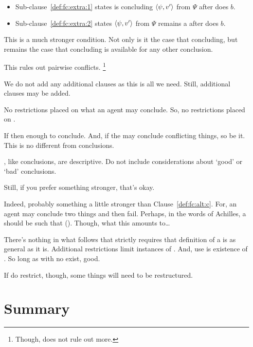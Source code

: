 \begin{note}
  \begin{itemize}[noitemsep]
  \item
    Sub-clause~\ref{def:fc:extra:1} states \vAgent{} is concluding \(\langle \psi, v' \rangle\) from \(\Psi\) after \vAgent{} does \(b\).
  \item
    Sub-clause~\ref{def:fc:extra:2} states \vAgent{} \(\langle \psi, v' \rangle\) from \(\Psi\) remains a \fc{} after \vAgent{} does \(b\).
  \end{itemize}

  \noindent This is a much stronger condition.
  Not only is it the case that concluding, but remains the case that concluding is available for any other conclusion.

  This rules out pairwise conflicts.%
  \footnote{
    Though, does not rule out more.
  }

  We do not add any additional clauses as this is all we need.
  Still, additional clauses may be added.

  No restrictions placed on what an agent may conclude.
  So, no restrictions placed on .

  If \fc{} then enough to conclude.
  And, if the may conclude conflicting things, so be it.
  This is no different from conclusions.

  , like conclusions, are descriptive.
  Do not include considerations about `good' or `bad' conclusions.
\end{note}

\begin{note}
  Still, if you prefer something stronger, that's okay.

  Indeed, probably something a little stronger than Clause~\autoref{def:fc:alt:c}.
  For, an agent may conclude two things and then fail.
  Perhaps, in the words of Achilles, a \fc{} should be such that  (\cite[280]{Carroll:1895uj}).
  Though, what this amounts to\dots

  There's nothing in what follows that strictly requires that definition of a \fc{} is as general as it is.
  Additional restrictions limit instances of .
  And, use is existence of .
  So long as  with no \wit{} exist, good.

  If do restrict, though, some things will need to be restructured.
\end{note}

\section*{Summary}


